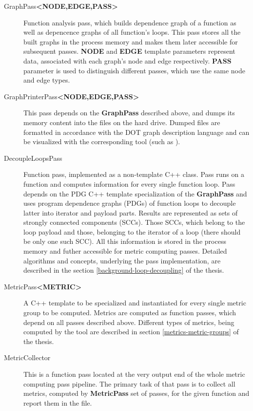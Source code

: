 \begin{description}
	
	\item [GraphPass\textbf{\textless NODE,EDGE,PASS\textgreater}] Function analysis pass, which builds dependence graph of a function as well as depencence graphs of all function's loops. This pass stores all the built graphs in the process memory and makes them later accessible for subsequent passes. \textbf{NODE} and \textbf{EDGE} template parameters represent data, associated with each graph's node and edge respectively. \textbf{PASS} parameter is used to distinguish different passes, which use the same node and edge types. 

	\item [GraphPrinterPass\textbf{\textless NODE,EDGE,PASS\textgreater}] This pass depends on the \textbf{GraphPass} described above, and dumps its memory content into the files on the hard drive. Dumped files are formatted in accordance with the DOT graph description language and can be visualized with the corresponding tool (such as \cite{graphviz-official-website}).    

	\item [DecoupleLoopsPass] Function pass, implemented as a non-template C++ class. Pass runs on a function and computes information for every single function loop. Pass depends on the PDG C++ template specialization of the \textbf{GraphPass} and uses program dependence graphs (PDGs) of function loops to decouple latter into iterator and payload parts. Results are represented as sets of strongly connected components (SCCs). Those SCCs, which belong to the loop payload and those, belonging to the iterator of a loop (there should be only one such SCC). All this information is stored in the process memory and futher accessible for metric computing passes. Detailed algorithms and concepts, underlying the pass implementation, are described in the section \ref{background-loop-decoupling} of the thesis.  

	\item [MetricPass\textbf{\textless METRIC\textgreater}] A C++ template to be specialized and instantiated for every single metric group to be computed. Metrics are computed as function passes, which depend on all passes described above. Different types of metrics, being computed by the tool are described in section \ref{metrics-metric-groups} of the thesis.
	
	\item [MetricCollector] This is a function pass located at the very output end of the whole metric computing pass pipeline. The primary task of that pass is to collect all metrics, computed by \textbf{MetricPass} set of passes, for the given function and report them in the file.     

\end{description} 

